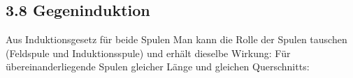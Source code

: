 \subsection*{3.8 Gegeninduktion}
    Aus Induktionsgesetz für beide Spulen
    Man kann die Rolle der Spulen tauschen (Feldspule und Induktionsspule) und erhält dieselbe Wirkung:
    Für übereinanderliegende Spulen gleicher Länge und gleichen Querschnitts:
